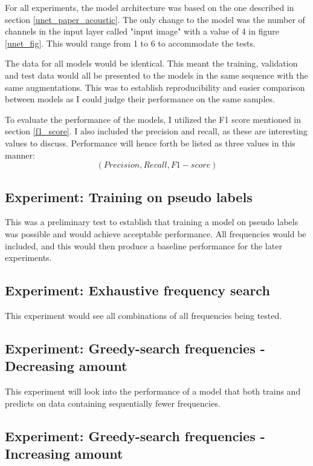         
        For all experiments, the model architecture was based on the one described in section \ref{unet_paper_acoustic}. The only change to the model was the number of channels in the input layer called "input image" with a value of 4 in figure \ref{unet_fig}. This would range from 1 to 6 to accommodate the tests.
        
        The data for all models would be identical. This meant the training, validation and test data would all be presented to the models in the same sequence with the same augmentations. This was to establish reproducibility and easier comparison between models as I could judge their performance on the same samples.
        
        To evaluate the performance of the models, I utilized the F1 score mentioned in section \ref{f1_score}. I also included the precision and recall, as these are interesting values to discuss. Performance will hence forth be listed as three values in this manner:
            \begin{equation} \label{performance_metric}
                (Precision, Recall, F1-score)
            \end{equation}
        
    \subsection{Experiment: Training on pseudo labels}
      This was a preliminary test to establish that training a model on pseudo labels was possible and would achieve acceptable performance. All frequencies would be included, and this would then produce a baseline performance for the later experiments. 
    
    \subsection{Experiment: Exhaustive frequency search}
        This experiment would see all combinations of all frequencies being tested. 


    \subsection{Experiment: Greedy-search frequencies - Decreasing amount}
        This experiment will look into the performance of a model that both trains and predicts on data containing sequentially fewer frequencies. 
        
        
    \subsection{Experiment: Greedy-search frequencies - Increasing amount}
    
        


